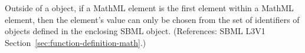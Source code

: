 Outside of a \FunctionDefinition object, if a MathML  element is
the first element within a MathML  element, then the
 element's value can only be chosen from the set of identifiers
of \FunctionDefinition{} objects defined in the enclosing SBML \Model
object.  (References: SBML L3V1
Section~\ref{sec:function-definition-math}.)
